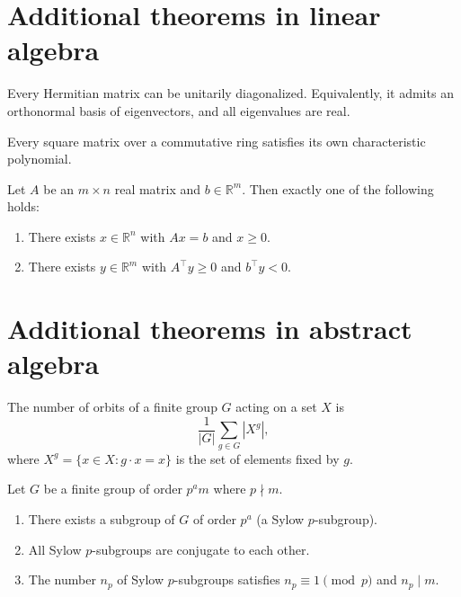 \documentclass[11pt]{scrartcl}
\providecommand{\RR}{\mathbb R}
\begin{document}
\section{Additional theorems in linear algebra}
\begin{theorem}
  Every Hermitian matrix can be unitarily diagonalized.
  Equivalently, it admits an orthonormal basis of eigenvectors,
  and all eigenvalues are real.
\end{theorem}

\begin{theorem}
  Every square matrix over a commutative ring
  satisfies its own characteristic polynomial.
\end{theorem}

\begin{theorem}
  Let $A$ be an $m \times n$ real matrix and $b \in \RR^m$.
  Then exactly one of the following holds:
  \begin{enumerate}
    \item There exists $x \in \RR^n$ with $Ax = b$ and $x \ge 0$.
    \item There exists $y \in \RR^m$ with $A^\top y \ge 0$ and $b^\top y < 0$.
  \end{enumerate}
\end{theorem}

\section{Additional theorems in abstract algebra}
\begin{theorem}
  The number of orbits of a finite group $G$ acting on a set $X$ is
  \[ \frac{1}{|G|} \sum_{g \in G} |X^g|, \]
  where $X^g = \{x \in X : g \cdot x = x\}$ is the set of elements fixed by $g$.
\end{theorem}

\begin{theorem}
  Let $G$ be a finite group of order $p^a m$ where $p \nmid m$.
  \begin{enumerate}
    \item There exists a subgroup of $G$ of order $p^a$ (a Sylow $p$-subgroup).
    \item All Sylow $p$-subgroups are conjugate to each other.
    \item The number $n_p$ of Sylow $p$-subgroups satisfies
      $n_p \equiv 1 \pmod{p}$ and $n_p \mid m$.
  \end{enumerate}
\end{theorem}
\end{document}
